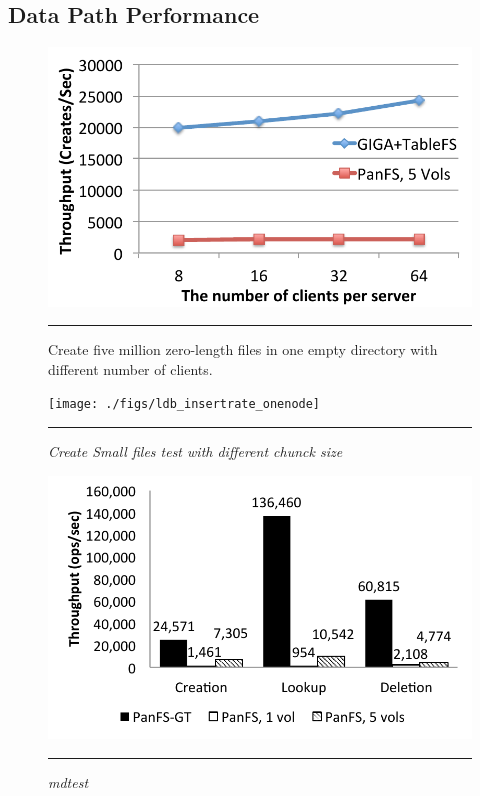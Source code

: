 \subsection{Data Path Performance}


\begin{figure}[t]  %
\centerline{\includegraphics[scale=0.5]{./figs/zero_file_creation_on_panfs}}
\vspace{10pt}
\caption{\normalsize
Create five million zero-length files in one empty directory
with different number of clients.
\textit{}
}
\vspace{10pt}
\hrule
\label{graph:ldb-singlenode}
\end{figure}       %

\begin{figure}[t]  %
\centerline{\texttt{[image: ./figs/ldb\_insertrate\_onenode]}}
\vspace{10pt}
\caption{\normalsize
\textit{Create Small files test with different chunck size}
}
\vspace{10pt}
\hrule
\label{graph:ldb-singlenode}
\end{figure}       %

\begin{figure}[t]  %
\centerline{\includegraphics[scale=0.5]{./figs/mdtest}}
\vspace{10pt}
\caption{\normalsize
\textit{mdtest }
}
\vspace{10pt}
\hrule
\label{graph:ldb-singlenode}
\end{figure}       %

